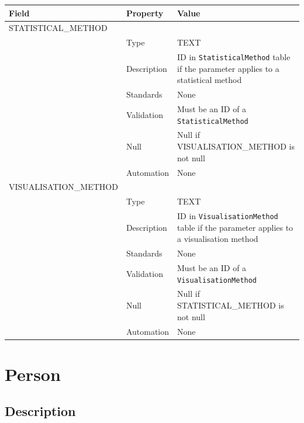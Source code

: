 \documentclass[
]{article}
\newcounter{none}
\begin{document}
{\def\LTcaptype{none} 
\begin{longtable}[]{@{}
  >{\raggedright\arraybackslash}p{}
  >{\raggedright\arraybackslash}p{}
  >{\raggedright\arraybackslash}p{}@{}}
\toprule\noalign{}
\begin{minipage}[b]{\linewidth}\raggedright
Field
\end{minipage} & \begin{minipage}[b]{\linewidth}\raggedright
Property
\end{minipage} & \begin{minipage}[b]{\linewidth}\raggedright
Value
\end{minipage} \\
\midrule\noalign{}
\endhead
\bottomrule\noalign{}
\endlastfoot
STATISTICAL\_METHOD & & \\
& Type & TEXT \\
& Description & ID in \texttt{StatisticalMethod} table if the parameter
applies to a statistical method \\
& Standards & None \\
& Validation & Must be an ID of a \texttt{StatisticalMethod} \\
& Null & Null if VISUALISATION\_METHOD is not null \\
& Automation & None \\
VISUALISATION\_METHOD & & \\
& Type & TEXT \\
& Description & ID in \texttt{VisualisationMethod} table if the
parameter applies to a visualisation method \\
& Standards & None \\
& Validation & Must be an ID of a \texttt{VisualisationMethod} \\
& Null & Null if STATISTICAL\_METHOD is not null \\
& Automation & None \\
\end{longtable}
}

\section{Person}\label{person}

\subsection{Description}\label{description-20}
\end{document}

